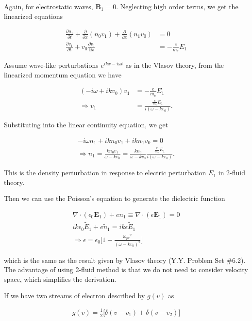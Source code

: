 \documentclass[
  notoc %
]{tufte-book}
\begin{document}
Again, for electrostatic waves, \(\mathbf{B}_1=0\). Neglecting high
order terms, we get the linearized equations

\[
\begin{aligned}
\frac{\partial n_1}{\partial t}+\frac{\partial}{\partial x}(n_0 v_1)+\frac{\partial }{\partial x}(n_1v_0)&=0 \\
\frac{\partial v_1}{\partial t}+v_0\frac{\partial v_1}{\partial x}&=-\frac{e}{m_e}E_1
\end{aligned}
\]

Assume wave-like perturbations \(e^{ikx-i\omega t}\) as in the Vlasov
theory, from the linearized momentum equation we have

\[
\begin{aligned}
(-i\omega+ikv_0)v_1&=-\frac{e}{m_e}E_1 \\
\Rightarrow v_1&=\frac{\frac{e}{m_e}E_1}{i(\omega-kv_0)}.
\end{aligned}
\]

Substituting into the linear continuity equation, we get

\[
\begin{aligned}
-i\omega n_1+ikn_0v_1+ikn_1v_0=0 \\
\Rightarrow n_1=\frac{kn_0v_1}{\omega-kv_0}=\frac{kn_0}{\omega-kv_0}\frac{\frac{e}{m_e}E_1}{i(\omega-kv_0)}.
\end{aligned}
\]

This is the density perturbation in response to electric perturbation
\(E_1\) in 2-fluid theory.

Then we can use the Poisson's equation to generate the dielectric
function

\[
\begin{aligned}
\nabla\cdot(\epsilon_0\mathbf{E}_1)+en_1\equiv\nabla\cdot(\epsilon \mathbf{E}_1)=0 \\
ik\epsilon_0 \tilde{E}_1+e\tilde{n}_1=ik\epsilon \tilde{E}_1 \\
\Rightarrow \epsilon=\epsilon_0 \Big[ 1-\frac{{\omega_{pe}}^2}{(\omega-kv_0)^2} \Big]
\end{aligned}
\]

which is the same as the result given by Vlasov theory (Y.Y. Problem Set
\#6.2). The advantage of using 2-fluid method is that we do not need to
consider velocity space, which simplifies the derivation.

If we have two streams of electron described by \(g(v)\) as

\[
\begin{aligned}
g(v)=\frac{1}{2}\big[ \delta(v-v_1)+\delta(v-v_2) \big]
\end{aligned}
\]
\end{document}
